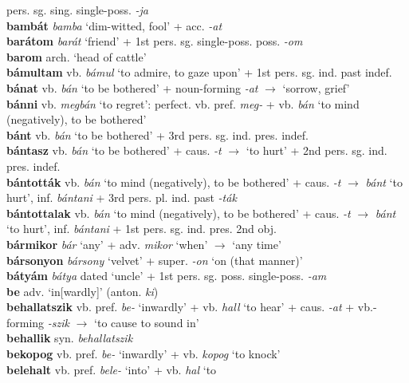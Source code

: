 \documentclass[11pt]{article}
\begin{document}
pers. sg. sing. single\hyp{}poss. \emph{-ja} \\
\textbf{bambát} \emph{bamba} `dim\hyp{}witted, fool' +
acc. \emph{-at} \\
\textbf{barátom} \emph{barát} `friend' + 1st
pers. sg. single\hyp{}poss. poss. \emph{-om} \\
\textbf{barom} arch. `head of cattle'  \\
\textbf{bámultam} vb. \emph{bámul} `to admire, to gaze upon' + 1st
pers. sg. ind. past indef. \\
\textbf{bánat} vb. \emph{bán} `to be bothered' +
noun\hyp{}forming \emph{-at} $\rightarrow$ `sorrow, grief' \\
\textbf{bánni} vb. \emph{megbán} `to regret':
perfect. vb. pref. \emph{meg-} + vb. \emph{bán} `to mind (negatively),
to be bothered' \\
\textbf{bánt} vb. \emph{bán} `to be bothered' + 3rd
pers. sg. ind. pres. indef. \\
\textbf{bántasz} vb. \emph{bán} `to be bothered' + caus. \emph{-t}
$\rightarrow$ `to hurt' + 2nd pers. sg. ind. pres. indef. \\
\textbf{bántották} vb. \emph{bán} `to mind (negatively),
to be bothered' + caus. \emph{-t} $\rightarrow$ \emph{bánt} `to hurt',
inf. \emph{bántani} + 3rd pers. pl. ind. past \emph{-ták} \\
\textbf{bántottalak} vb. \emph{bán} `to mind (negatively),
to be bothered' + caus. \emph{-t} $\rightarrow$ \emph{bánt} `to hurt',
inf. \emph{bántani} + 1st pers. sg. ind. pres. 2nd obj. \\
\textbf{bármikor} \emph{bár} `any' + adv. \emph{mikor} `when'
  $\rightarrow$ `any time' \\
\textbf{bársonyon} \emph{bársony} `velvet' + super. \emph{-on}
`on (that manner)' \\
\textbf{bátyám} \emph{bátya} dated `uncle' + 1st
pers. sg. poss. single\hyp{}poss. \emph{-am} \\
\textbf{be} adv. `in[wardly]' (anton. \emph{ki}) \\
\textbf{behallatszik} vb. pref. \emph{be-} `inwardly' +
vb. \emph{hall} `to hear' + caus. \emph{-at} +
vb.-forming \emph{-szik} $\rightarrow$ `to cause to sound in' \\
\textbf{behallik} syn. \emph{behallatszik} \\
\textbf{bekopog} vb. pref. \emph{be-} `inwardly' + vb. \emph{kopog}
`to knock' \\
\textbf{belehalt} vb. pref. \emph{bele-} `into' + vb. \emph{hal} `to
\end{document}
